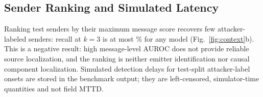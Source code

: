 \documentclass[preprint,12pt,numafflabel]{elsarticle}
\begin{document}
\begin{table}
\centering
\caption{Held-out scenario \texttt{\ResHeldoutScenario}: models, normalization, checkpoints, and validation-F1 thresholds from InTAS highway 2 applied unchanged to the held-out official test split (mean $\pm$ standard deviation over \ResSeeds{} training seeds; recall and FAR are seed means at the highway 2 threshold). Category columns give AUROC within each attack category, and the last column repeats the official highway 2 test AUROC. Takeaway: ranking and model ordering transfer to a different area of the InTAS scenario with the same attack types, while false-alarm rates at transferred thresholds change.}
\label{tab:heldout}
{\scriptsize}
\end{table}

\subsection{Sender Ranking and Simulated Latency}
Ranking test senders by their maximum message score recovers few attacker-labeled senders: recall at $k=3$ is at most \ResMaxRecallThree\% for any model (Fig.~\ref{fig:context}b). This is a negative result: high message-level AUROC does not provide reliable source localization, and the ranking is neither emitter identification nor causal component localization. Simulated detection delays for test-split attacker-label onsets are stored in the benchmark output; they are left-censored, simulator-time quantities and not field MTTD.
\end{document}
